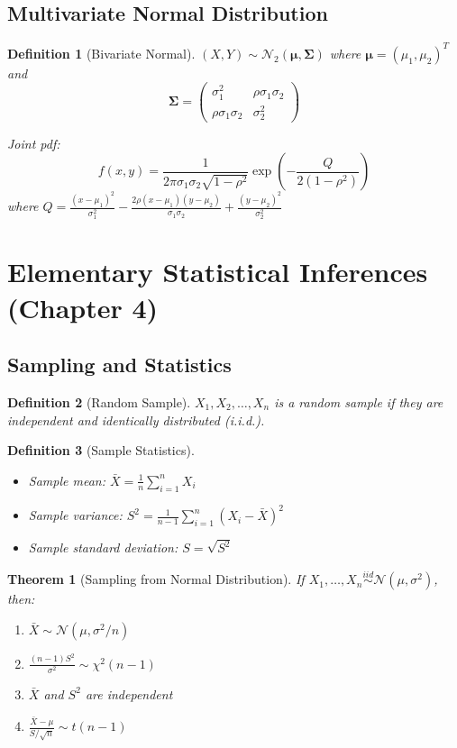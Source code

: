 \documentclass[12pt,a4paper]{amsart}
\newtheorem{theorem}{Theorem}[section]
\newtheorem{definition}{Definition}[section]
\theoremstyle{remark}
\begin{document}
\subsection{Multivariate Normal Distribution}

\begin{definition}[Bivariate Normal]
$(X,Y) \sim \mathcal{N}_2(\boldsymbol{\mu}, \boldsymbol{\Sigma})$ where $\boldsymbol{\mu} = (\mu_1, \mu_2)^T$ and
$$\boldsymbol{\Sigma} = \begin{pmatrix} \sigma_1^2 & \rho\sigma_1\sigma_2 \\ \rho\sigma_1\sigma_2 & \sigma_2^2 \end{pmatrix}$$

Joint pdf:
$$f(x,y) = \frac{1}{2\pi\sigma_1\sigma_2\sqrt{1-\rho^2}} \exp\left(-\frac{Q}{2(1-\rho^2)}\right)$$
where $Q = \frac{(x-\mu_1)^2}{\sigma_1^2} - \frac{2\rho(x-\mu_1)(y-\mu_2)}{\sigma_1\sigma_2} + \frac{(y-\mu_2)^2}{\sigma_2^2}$
\end{definition}

\section{Elementary Statistical Inferences (Chapter 4)}

\subsection{Sampling and Statistics}

\begin{definition}[Random Sample]
$X_1, X_2, \ldots, X_n$ is a random sample if they are independent and identically distributed (i.i.d.).
\end{definition}

\begin{definition}[Sample Statistics]
\begin{itemize}
\item Sample mean: $\bar{X} = \frac{1}{n}\sum_{i=1}^n X_i$
\item Sample variance: $S^2 = \frac{1}{n-1}\sum_{i=1}^n (X_i - \bar{X})^2$
\item Sample standard deviation: $S = \sqrt{S^2}$
\end{itemize}
\end{definition}

\begin{theorem}[Sampling from Normal Distribution]
If $X_1, \ldots, X_n \stackrel{iid}{\sim} \mathcal{N}(\mu, \sigma^2)$, then:
\begin{enumerate}
\item $\bar{X} \sim \mathcal{N}(\mu, \sigma^2/n)$
\item $\frac{(n-1)S^2}{\sigma^2} \sim \chi^2(n-1)$
\item $\bar{X}$ and $S^2$ are independent
\item $\frac{\bar{X} - \mu}{S/\sqrt{n}} \sim t(n-1)$
\end{enumerate}
\end{theorem}
\end{document}
